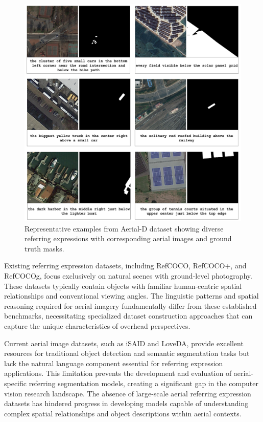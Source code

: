\begin{figure}[H]
\centering
\includegraphics[width=\columnwidth]{./images/6samples.png}
\caption{Representative examples from Aerial-D dataset showing diverse referring expressions with corresponding aerial images and ground truth masks.}
\label{fig:dataset_examples}
\end{figure}

Existing referring expression datasets, including RefCOCO, RefCOCO+, and RefCOCOg, focus exclusively on natural scenes with ground-level photography. These datasets typically contain objects with familiar human-centric spatial relationships and conventional viewing angles. The linguistic patterns and spatial reasoning required for aerial imagery fundamentally differ from these established benchmarks, necessitating specialized dataset construction approaches that can capture the unique characteristics of overhead perspectives.

Current aerial image datasets, such as iSAID and LoveDA, provide excellent resources for traditional object detection and semantic segmentation tasks but lack the natural language component essential for referring expression applications. This limitation prevents the development and evaluation of aerial-specific referring segmentation models, creating a significant gap in the computer vision research landscape. The absence of large-scale aerial referring expression datasets has hindered progress in developing models capable of understanding complex spatial relationships and object descriptions within aerial contexts.

